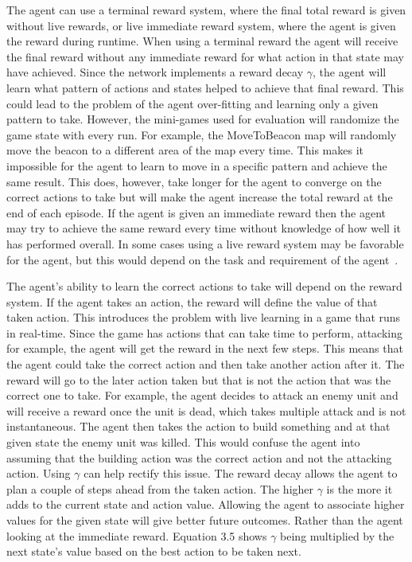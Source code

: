 The agent can use a terminal reward system, where the final total reward is
given without live rewards, or live immediate reward system, where the agent is
given the reward during runtime. When using a terminal reward the agent will
receive the final reward without any immediate reward for what action in that
state may have achieved. Since the network implements a reward decay $\gamma$,
the agent will learn what pattern of actions and states helped to achieve that
final reward. This could lead to the problem of the agent over-fitting and
learning only a given pattern to take. However, the mini-games used for
evaluation will randomize the game state with every run. For example, the
MoveToBeacon map will randomly move the beacon to a different area of the map
every time. This makes it impossible for the agent to learn to move in a
specific pattern and achieve the same result. This does, however, take longer for
the agent to converge on the correct actions to take but will make the agent
increase the total reward at the end of each episode. If the agent is given an
immediate reward then the agent may try to achieve the same reward every time
without knowledge of how well it has performed overall. In some cases using a
live reward system may be favorable for the agent, but this would depend on the
task and requirement of the agent~\cite{shelton2001balancing}.

The agent's ability to learn the correct actions to take will depend on the reward system. If the agent takes an action, the reward will define the value of that taken action. This introduces the problem with live learning in a game that runs in real-time. Since the game has actions that can take time to perform, attacking for example, the agent will get the reward in the next few steps. This means that the agent could take the correct action and then take another action after it. The reward will go to the later action taken but that is not the action that was the correct one to take. For example, the agent decides to attack an enemy unit and will receive a reward once the unit is dead, which takes multiple attack and is not instantaneous. The agent then takes the action to build something and at that given state the enemy unit was killed. This would confuse the agent into assuming that the building action was the correct action and not the attacking action. Using $\gamma$ can help rectify this issue. The reward decay allows the agent to plan a couple of steps ahead from the taken action. The higher $\gamma$ is the more it adds to the current state and action value. Allowing the agent to associate higher values for the given state will give better future outcomes. Rather than the agent looking at the immediate reward. Equation 3.5 shows $\gamma$ being multiplied by the next state's value based on the best action to be taken next.

